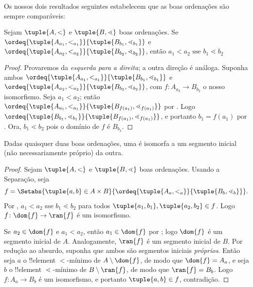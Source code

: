 \documentclass[../../../include/open-logic-section]{subfiles}
\begin{document}
Os nossos dois resultados seguintes estabelecem que as boas ordenações são sempre
comparáveis:

\begin{lem}
Sejam $\tuple{A, <}$ e $\tuple{B, \lessdot}$ boas ordenações. Se
$\ordeq{\tuple{A_{a_1}, <_{a_1}}}{\tuple{B_{b_1}, \lessdot_{b_1}}}$
e $\ordeq{\tuple{A_{{a_2}}, <_{a_2}}}{\tuple{B_{{b_2}},
\lessdot_{b_2}}}$, então ${a_1}  < {a_2} \text{ sse }{b_1} \lessdot
{b_2}$
\end{lem}

\begin{proof}
Provaremos da \emph{esquerda para a direita}; a outra direção é análoga.
Suponha ambos $\ordeq{\tuple{A_{a_1}, <_{a_1}}}{\tuple{B_{b_1},
\lessdot_{b_1}}}$ e $\ordeq{\tuple{A_{{a_2}},
<_{a_2}}}{\tuple{B_{{b_2}}, \lessdot_{b_2}}}$, com $f \colon
A_{{a_2}} \to B_{{b_2}}$ o nosso isomorfismo. Seja ${a_1} < {a_2}$; então
$\ordeq{\tuple{A_{a_1}, <_{a_1}}}{\tuple{B_{f({a_1})},
\lessdot_{f({a_1})}}}$ por . Logo
$\ordeq{\tuple{B_{b_1}, \lessdot_{b_1}}}{\tuple{B_{f({a_1})},
\lessdot_{f({a_1})}}}$, e portanto ${b_1} = f({a_1})$ por
. Ora, ${b_1} \lessdot {b_2}$ pois o domínio de $f$
é $B_{{b_2}}$.	
\end{proof}

\begin{thm}
Dadas quaisquer duas boas ordenações, uma é isomorfa a um segmento inicial
(não necessariamente próprio) da outra.
\end{thm}

\begin{proof}
Sejam $\tuple{A, <}$ e $\tuple{B, \lessdot}$ boas ordenações. Usando a
Separação, seja
\[
	f = \Setabs{\tuple{a, b} \in A \times B}{
		\ordeq{\tuple{A_a, <_a}}{\tuple{B_b, \lessdot_b}}}.
\]
Por , $a_1 < a_2$ sse $b_1 \lessdot b_2$ para todos
$\tuple{a_1, b_1}, \tuple{a_2, b_2} \in f$. Logo $f \colon \dom{f} \to
\ran{f}$ é um isomorfismo. 

Se $a_2 \in \dom{f}$ e $a_1 < a_2$, então $a_1 \in \dom{f}$ por
; logo $\dom{f}$ é um segmento inicial de
$A$. Analogamente, $\ran{f}$ é um segmento inicial de $B$. Por redução ao absurdo,
suponha que ambos são segmentos iniciais \emph{próprios}. Então seja $a$ o
!!{element} $<$-mínimo de $A \setminus \dom{f}$, de modo que $\dom{f} =
A_a$, e seja $b$ o !!{element} $\lessdot$-mínimo de $B \setminus
\ran{f}$, de modo que $\ran{f} = B_b$. Logo $f \colon A_a \to B_b$ é um
isomorfismo, e portanto $\tuple{a, b} \in f$, contradição.
\end{proof}
\end{document}
